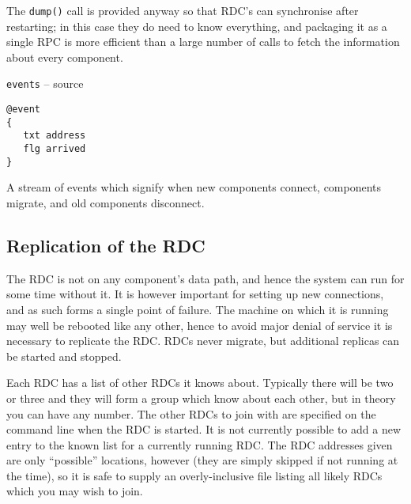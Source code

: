 \documentclass[12pt,a4paper,twoside]{article}
\renewcommand{\_}{\texttt{\symbol{95}}}
\begin{document}
\begin{bulletlist}
The \verb^dump()^ call is provided anyway so that RDC's can
synchronise after restarting; in this case they do need to know
everything, and packaging it as a single RPC is more efficient
than a large number of calls to fetch the information about
every component.

\item \texttt{events} -- source

\begin{verbatim}
@event
{
   txt address
   flg arrived
}
\end{verbatim}

A stream of events which signify when new components
connect, components migrate, and old components disconnect.

%
%
%
	
\end{bulletlist}

\subsection{Replication of the RDC}

The RDC is not on any component's data path, and hence the system can
run for some time without it. It is however important for setting up
new connections, and as such forms a single point of failure. The
machine on which it is running may well be rebooted like any other, hence
to avoid major denial of service it is necessary to replicate the RDC.
RDCs never migrate, but additional replicas can be started and stopped.

Each RDC has a list of other RDCs it knows about. Typically there
will be two or three and they will form a group which know about each
other, but in theory you can have any number. The other RDCs to join
with are specified on the command line when the RDC is started.
It is not currently possible to add a new entry to the known list
for a currently running RDC. The RDC addresses given are only
``possible'' locations, however (they are simply skipped if not
running at the time), so it is safe to supply an overly-inclusive file
listing all likely RDCs which you may wish to join.
\end{document}
